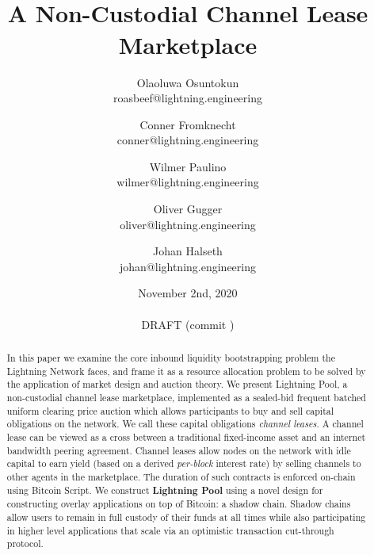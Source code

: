 \documentclass[10pt,a4paper]{article}
\theoremstyle{definition}
\begin{document}
\title{\texttt{} \\
    A Non-Custodial Channel Lease Marketplace}
\author{
    Olaoluwa Osuntokun \\
    \small{roasbeef@lightning.engineering}
    \and
    Conner Fromknecht \\
    \small{conner@lightning.engineering}
     \and
     Wilmer Paulino  \\
    \small{wilmer@lightning.engineering}
     \and
     Oliver Gugger \\
    \small{oliver@lightning.engineering}
     \and
     Johan Halseth \\
    \small{johan@lightning.engineering}
}

\date{November 2nd, 2020 \\~\\ DRAFT (commit \gitAbbrevHash)}
\maketitle

\begin{abstract}

In this paper we examine the core inbound liquidity bootstrapping problem the
Lightning Network faces, and frame it as a resource allocation problem to be
solved by the application of market design and auction theory. We present
Lightning Pool, a non-custodial channel lease marketplace, implemented as a
sealed-bid frequent batched uniform clearing price auction which allows
participants to buy and sell capital obligations on the network. We call these
capital obligations \emph{channel leases}. A channel lease can be viewed as a
cross between a traditional fixed-income asset and an internet bandwidth
peering agreement. Channel leases allow nodes on the network with idle capital
to earn yield (based on a derived \emph{per-block} interest rate) by selling
channels to other agents in the marketplace. The duration of such contracts is
enforced on-chain using Bitcoin Script. We construct \textbf{Lightning Pool}
using a novel design for constructing overlay applications on top of Bitcoin: a
shadow chain. Shadow chains allow users to remain in full custody of their
funds at all times while also participating in higher level applications that
scale via an optimistic transaction cut-through protocol.

\end{abstract}

\newpage
\end{document}
